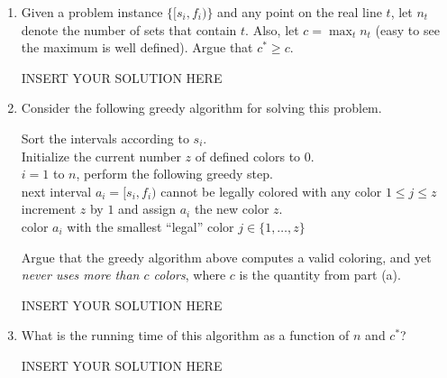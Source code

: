 \begin{enumerate}

    \item Given a problem instance $\{[s_i,f_i)\}$ and any point on the real line $t$, let $n_t$ denote the number of sets that contain $t$. Also, let $c = \max_t n_t$ (easy to see the maximum is well defined). Argue that $c^*\ge c$.
\begin{solution}   INSERT YOUR SOLUTION HERE   \end{solution}


    \item Consider the following greedy algorithm for solving this problem.

    \vspace*{-1ex}
    \begin{code}
    \> Sort the intervals according to $s_i$. \\
    \> Initialize the current number $z$ of defined colors to $0$. \\
    \> \For $i = 1$ to $n$, perform the following greedy step. \\
    \> \> \If next interval $a_i = [s_i, f_i)$ cannot be legally colored
    with any color $1\le j\le z$\\
    \> \> \Then increment $z$ by $1$ and assign $a_i$ the new color $z$.\\
    \> \> \Else color $a_i$ with the smallest ``legal'' color
    $j\in \{1, \ldots, z\}$  \\
    \end{code}

    Argue that the greedy algorithm above computes a valid coloring, and yet {\em never uses more than $c$ colors}, where $c$ is the quantity from part (a). 


\begin{solution}   INSERT YOUR SOLUTION HERE   \end{solution}


    \item What is the running time of this algorithm as a function of $n$ and $c^*$?


\begin{solution}   INSERT YOUR SOLUTION HERE   \end{solution}


\end{enumerate}